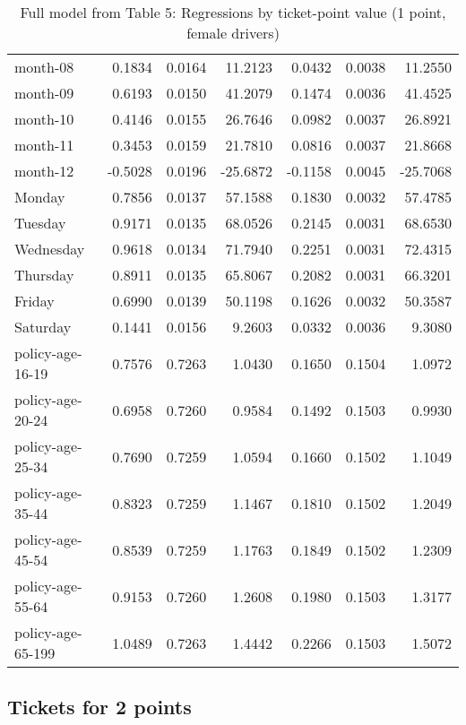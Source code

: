 \documentclass[10pt]{article}
\begin{document}
\begin{table}[ht]
\begin{tabular}{lrrrrrr}
  month-08 & 0.1834 & 0.0164 & 11.2123 & 0.0432 & 0.0038 & 11.2550 \\ 
  month-09 & 0.6193 & 0.0150 & 41.2079 & 0.1474 & 0.0036 & 41.4525 \\ 
  month-10 & 0.4146 & 0.0155 & 26.7646 & 0.0982 & 0.0037 & 26.8921 \\ 
  month-11 & 0.3453 & 0.0159 & 21.7810 & 0.0816 & 0.0037 & 21.8668 \\ 
  month-12 & -0.5028 & 0.0196 & -25.6872 & -0.1158 & 0.0045 & -25.7068 \\ 
  Monday & 0.7856 & 0.0137 & 57.1588 & 0.1830 & 0.0032 & 57.4785 \\ 
  Tuesday & 0.9171 & 0.0135 & 68.0526 & 0.2145 & 0.0031 & 68.6530 \\ 
  Wednesday & 0.9618 & 0.0134 & 71.7940 & 0.2251 & 0.0031 & 72.4315 \\ 
  Thursday & 0.8911 & 0.0135 & 65.8067 & 0.2082 & 0.0031 & 66.3201 \\ 
  Friday & 0.6990 & 0.0139 & 50.1198 & 0.1626 & 0.0032 & 50.3587 \\ 
  Saturday & 0.1441 & 0.0156 & 9.2603 & 0.0332 & 0.0036 & 9.3080 \\ 
  policy-age-16-19 & 0.7576 & 0.7263 & 1.0430 & 0.1650 & 0.1504 & 1.0972 \\ 
  policy-age-20-24 & 0.6958 & 0.7260 & 0.9584 & 0.1492 & 0.1503 & 0.9930 \\ 
  policy-age-25-34 & 0.7690 & 0.7259 & 1.0594 & 0.1660 & 0.1502 & 1.1049 \\ 
  policy-age-35-44 & 0.8323 & 0.7259 & 1.1467 & 0.1810 & 0.1502 & 1.2049 \\ 
  policy-age-45-54 & 0.8539 & 0.7259 & 1.1763 & 0.1849 & 0.1502 & 1.2309 \\ 
  policy-age-55-64 & 0.9153 & 0.7260 & 1.2608 & 0.1980 & 0.1503 & 1.3177 \\ 
  policy-age-65-199 & 1.0489 & 0.7263 & 1.4442 & 0.2266 & 0.1503 & 1.5072 \\ 
   \hline
\end{tabular}
\caption{Full model from Table 5: Regressions by ticket-point value (1 point, female drivers)} 
\label{tab_5_1_pts_F}
\end{table}


\clearpage
\pagebreak




\subsection{Tickets for 2 points}
\end{document}
